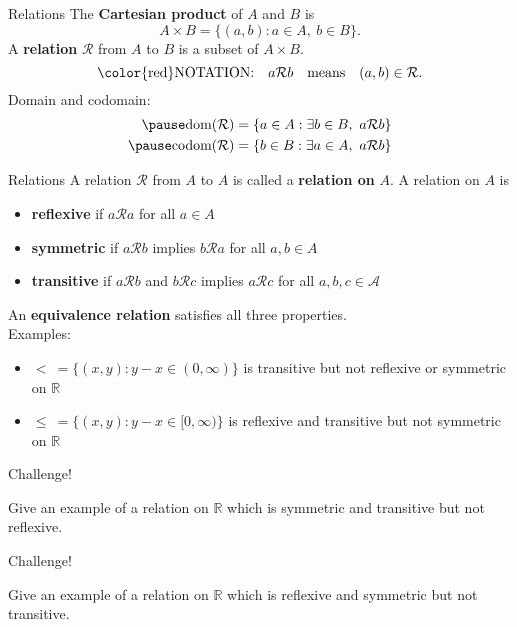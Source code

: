 \documentclass{beamer}
\begin{document}
\begin{frame}{Relations}
The \textbf{Cartesian product} of $A$ and $B$ is
$$A\times B = \{(a,b): a\in A,\ b\in B\}.$$
\pause
A \textbf{relation} $\mathcal R$ from $A$ to $B$ is a subset of $A\times B$.\\
\pause
$$\text{\color{red}NOTATION:}\quad a\mathcal R b\quad\text{means}\quad (a,b)\in \mathcal R.$$
\pause
Domain and codomain:
\pause
\begin{align*}
\pause
\text{dom}(\mathcal{R}) &= \{a\in A: \exists b\in B,\ a\mathcal R b\}\\
\pause
\text{codom}(\mathcal{R}) &= \{b\in B: \exists a\in A,\ a\mathcal R b\}
\end{align*}
\end{frame}

\begin{frame}{Relations}
A relation $\mathcal R$ from $A$ to $A$ is called a \textbf{relation on} $A$.  A relation on $A$ is
\begin{itemize}
\pause
\item \textbf{reflexive} if $a\mathcal Ra$ for all $a\in A$
\pause
\item \textbf{symmetric} if $a\mathcal Rb$ implies $b\mathcal Ra$ for all $a,b\in A$
\pause
\item \textbf{transitive} if $a\mathcal Rb$ and $b\mathcal Rc$ implies $a\mathcal Rc$ for all $a,b,c\in\mathcal A$
\end{itemize}
\pause
An \textbf{equivalence relation} satisfies all three properties.\\
\pause
Examples:
\pause
\begin{itemize}
\pause
\item $<\ = \{(x,y): y-x\in (0,\infty)\}$ is transitive but not reflexive or symmetric on $\mathbb{R}$
\pause
\item $\leq\ = \{(x,y): y-x\in [0,\infty)\}$ is reflexive and transitive but not symmetric on $\mathbb{R}$
\end{itemize}
\end{frame}

\begin{frame}{Challenge!}
\begin{prob}
Give an example of a relation on $\mathbb{R}$ which is symmetric and transitive but not reflexive.
\end{prob}
\end{frame}

\begin{frame}{Challenge!}
\begin{prob}
Give an example of a relation on $\mathbb{R}$ which is reflexive and symmetric but not transitive.
\end{prob}
\end{frame}
\end{document}
